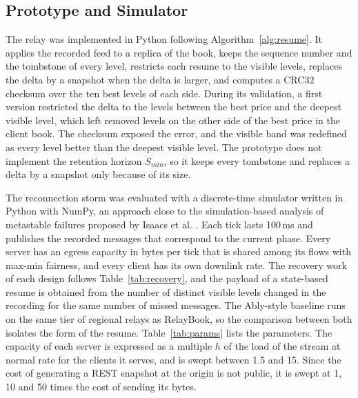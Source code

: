 \documentclass[conference]{IEEEtran}
\begin{document}
\subsection{Prototype and Simulator}

The relay was implemented in Python following Algorithm~\ref{alg:resume}. It applies the recorded feed to a replica of the book, keeps the sequence number and the tombstone of every level, restricts each resume to the visible levels, replaces the delta by a snapshot when the delta is larger, and computes a CRC32 checksum over the ten best levels of each side. During its validation, a first version restricted the delta to the levels between the best price and the deepest visible level, which left removed levels on the other side of the best price in the client book. The checksum exposed the error, and the visible band was redefined as every level better than the deepest visible level. The prototype does not implement the retention horizon $S_{min}$, so it keeps every tombstone and replaces a delta by a snapshot only because of its size.

The reconnection storm was evaluated with a discrete-time simulator written in Python with NumPy, an approach close to the simulation-based analysis of metastable failures proposed by Isaacs et al. \cite{isaacs2025}. Each tick lasts 100\,ms and publishes the recorded messages that correspond to the current phase. Every server has an egress capacity in bytes per tick that is shared among its flows with max-min fairness, and every client has its own downlink rate. The recovery work of each design follows Table~\ref{tab:recovery}, and the payload of a state-based resume is obtained from the number of distinct visible levels changed in the recording for the same number of missed messages. The Ably-style baseline runs on the same tier of regional relays as RelayBook, so the comparison between both isolates the form of the resume. Table~\ref{tab:params} lists the parameters. The capacity of each server is expressed as a multiple $h$ of the load of the stream at normal rate for the clients it serves, and is swept between 1.5 and 15. Since the cost of generating a REST snapshot at the origin is not public, it is swept at 1, 10 and 50 times the cost of sending its bytes.
\end{document}
